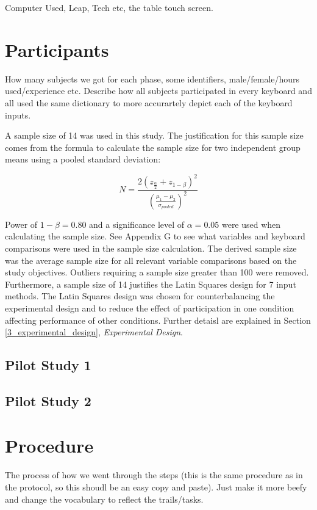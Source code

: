 Computer Used, Leap, Tech etc, the table touch screen.

\section{Participants}

How many subjects we got for each phase, some identifiers, male/female/hours used/experience etc. Describe how all subjects participated in every keyboard and all used the same dictionary to more accurartely depict each of the keyboard inputs.

A sample size of 14 was used in this study. The justification for this sample size comes from the formula to calculate the sample size for two independent group means using a pooled standard deviation:

\begin{equation}
 N = \frac{2(z_{\frac{\alpha}{2}} + z_{1-\beta})^2}{(\frac{\mu_1 - \mu_2}{\sigma_{pooled}})^2}
\end{equation}

Power of $1-\beta = 0.80$ and a significance level of $\alpha = 0.05$ were used when calculating the sample size. See Appendix G to see what variables and keyboard comparisons were used in the sample size calculation. The derived sample size was the average sample size for all relevant variable comparisons based on the study objectives. Outliers requiring a sample size greater than 100 were removed. Furthermore, a sample size of 14 justifies the Latin Squares design for 7 input methods. The Latin Squares design was chosen for counterbalancing the experimental design and to reduce the effect of participation in one condition affecting performance of other conditions. Further detaisl are explained in Section \ref{3_experimental_design}, \textit{Experimental Design}.

\subsection{Pilot Study 1}

\subsection{Pilot Study 2}

\section{Procedure}

The process of how we went through the steps (this is the same procedure as in the protocol, so this shoudl be an easy copy and paste). Just make it more beefy and change the vocabulary to reflect the trails/tasks.

